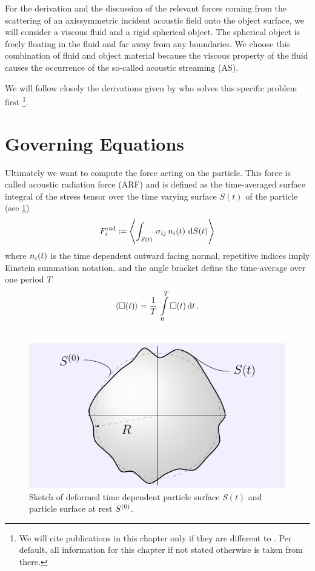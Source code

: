 For the derivation and the discussion of the relevant forces coming from the 
scattering of an axissymmetric incident acoustic field onto the object surface, 
we will consider a viscous fluid and a rigid spherical object. The spherical 
object is freely floating in the fluid and far away from any boundaries. We 
choose this combination of fluid and object material because the viscous 
property of the fluid causes the occurrence of the so-called acoustic streaming 
(AS).

We will follow closely the derivations given by  who 
solves this specific problem first \footnote{We will cite publications in this 
chapter only if they are different to . Per default, 
all information for this chapter if not stated otherwise is taken from there.}.

\section{Governing Equations}

Ultimately we want to compute the force acting on the particle. This force is 
called acoustic radiation force (ARF) and is defined as the time-averaged 
surface integral of the stress tensor over the time varying surface $S(t)$ of 
the particle (see \cref{fig:TA-deformed_circle})
\begin{equation}
  F^{\mathrm{rad}}_{i} \coloneqq
  \left\langle \int_{S(t)}\,\sigma_{ij}\,n_{i}(t)\,\dd{S(t)} \right\rangle
  \label{eq:TA-def-rad}
\end{equation}
where $n_{i}(t)$ is the time dependent outward facing normal, repetitive 
indices imply Einstein summation notation, and the angle bracket define the 
time-average over one period $T$
\begin{equation}
  \left\langle \Box(t) \right\rangle = \frac{1}{T}\,\int\limits_{0}^{T}\Box(t)\dd{t}.
  \label{eq:TA-time-average}
\end{equation}

\begin{figure}[tbp]
  \centering
  \includegraphics[]{External/deformed_circle.pdf}
  \caption{Sketch of deformed time dependent particle surface $S(t)$ and 
  particle surface at rest $S^{(0)}$.}
  \label{fig:TA-deformed_circle}
\end{figure}

